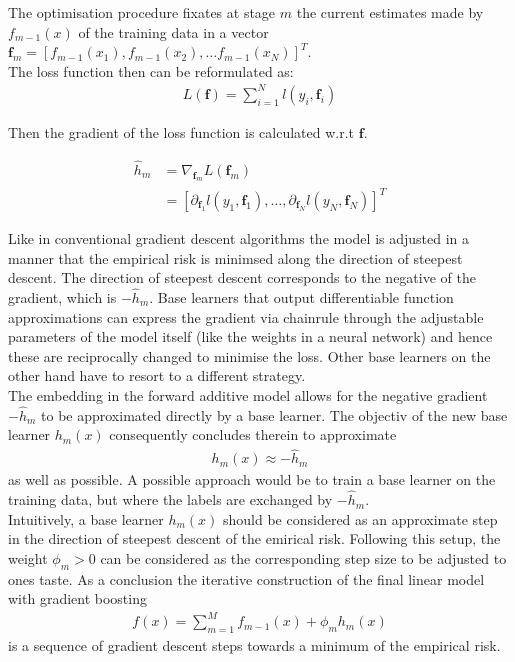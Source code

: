 \documentclass[a4paper, 11pt]{article}
\begin{document}
The optimisation procedure fixates at stage $m$ the current estimates made by $f_{m-1}(x)$ of the training data in a vector $\mathbf{f}_m = [f_{m-1}(x_1), f_{m-1}(x_2), \ldots f_{m-1}(x_N)]^T$. \\

The loss function then can be reformulated as:
\begin{align*}
L(\mathbf{f}) = \sum_{i = 1}^{N}l(y_i, \mathbf{f}_i)
\end{align*}

Then the gradient of the loss function is calculated w.r.t $\mathbf{f}$.

\begin{align*}
\hat{h}_m &= \nabla_{\mathbf{f}_m}L(\mathbf{f}_m) \\
&=[\partial_{\mathbf{f}_1} l(y_1, \mathbf{f}_1),\ldots, \partial_{\mathbf{f}_N} l(y_N, \mathbf{f}_N)]^T
\end{align*}

Like in conventional gradient descent algorithms the model is adjusted in a manner that the empirical risk is minimsed along the direction of steepest descent. The direction of steepest descent corresponds to the negative of the gradient, which is $- \hat{h}_m$. Base learners that output differentiable function approximations can express the gradient via chainrule through the adjustable parameters of the model itself (like the weights in a neural network) and hence these are reciprocally changed to minimise the loss. Other base learners on the other hand have to resort to a different strategy.\\
The embedding in the forward additive model allows for the negative gradient $-\hat{h}_m$ to be approximated directly by a base learner. The objectiv of the new base learner $h_m(x)$ consequently concludes therein to approximate
\begin{align*}
h_m(x) \approx -\hat{h}_m
\end{align*}
as well as possible. A possible approach would be to train a base learner on the training data, but where the labels are exchanged by $-\hat{h}_m$.\\
Intuitively, a base learner $h_m(x)$ should be considered as an approximate step in the direction of steepest descent of the emirical risk. Following this setup, the weight $\phi_m > 0$ can be considered as the corresponding step size to be adjusted to ones taste. As a conclusion the iterative construction of the final linear model with gradient boosting
\begin{align*}
f(x) = \sum_{m=1}^{M}f_{m-1}(x) + \phi_m h_m(x)
\end{align*}
is a sequence of gradient descent steps towards a minimum of the empirical risk. 
\end{document}
